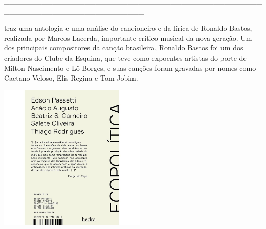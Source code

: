 \hspace*{-2cm}\_\_\_\_\_\_\_\_\_\_\_\_\_\_\_\_\_\_\_\_\_\_\_\_\_\_\_\_\_\_\_\_\_\_\_\_\_\_\_\_\_\_\_\_\_\_\_\_\_\_\_\_\_\_\_\_\_\_\_\_\_\_\_\_\_\_\_\_\_\_\_\_\_\_

\medskip

 traz uma antologia e uma análise do cancioneiro e da lírica de Ronaldo Bastos, realizada por Marcos Lacerda, importante crítico musical da nova geração. Um dos principais compositores da canção brasileira, Ronaldo Bastos foi um dos criadores do Clube da Esquina, que teve como expoentes artistas do porte de Milton Nascimento e Lô Borges, e suas canções foram gravadas por nomes como Caetano Veloso, Elis Regina e Tom Jobim.

\hspace{.5cm}

\hspace*{-.4cm}\begin{minipage}[c]{0.90\linewidth}
\small{
{}}
\end{minipage}

\pagebreak

\hspace{.5cm}

\begin{center}
\hspace*{-.5cm}\includegraphics[width=70mm]{eco.jpeg}
\end{center}

